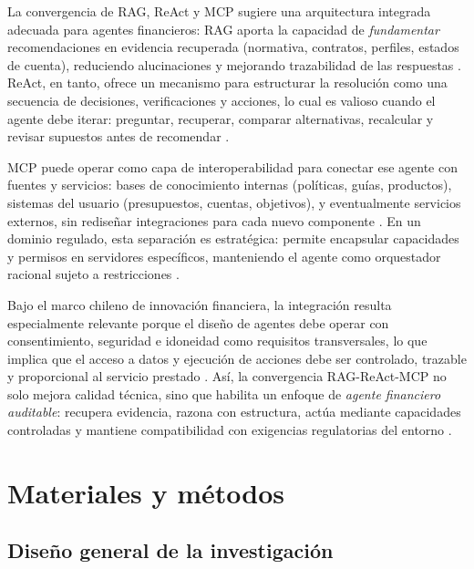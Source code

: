 \documentclass[
	spanish, %
	letterpaper, oneside
]{book}
\begin{document}
La convergencia de RAG, ReAct y MCP sugiere una arquitectura integrada adecuada para agentes financieros: RAG aporta la capacidad de \emph{fundamentar} recomendaciones en evidencia recuperada (normativa, contratos, perfiles, estados de cuenta), reduciendo alucinaciones y mejorando trazabilidad de las respuestas \cite{yu2024rag_survey}. ReAct, en tanto, ofrece un mecanismo para estructurar la resolución como una secuencia de decisiones, verificaciones y acciones, lo cual es valioso cuando el agente debe iterar: preguntar, recuperar, comparar alternativas, recalcular y revisar supuestos antes de recomendar \cite{yao2023react}.

MCP puede operar como capa de interoperabilidad para conectar ese agente con fuentes y servicios: bases de conocimiento internas (políticas, guías, productos), sistemas del usuario (presupuestos, cuentas, objetivos), y eventualmente servicios externos, sin rediseñar integraciones para cada nuevo componente \cite{hou2025mcp}. En un dominio regulado, esta separación es estratégica: permite encapsular capacidades y permisos en servidores específicos, manteniendo el agente como orquestador racional sujeto a restricciones \cite{russell2010aima,hou2025mcp}.

Bajo el marco chileno de innovación financiera, la integración resulta especialmente relevante porque el diseño de agentes debe operar con consentimiento, seguridad e idoneidad como requisitos transversales, lo que implica que el acceso a datos y ejecución de acciones debe ser controlado, trazable y proporcional al servicio prestado \cite{ley21521,cmf_fintech}. Así, la convergencia RAG-ReAct-MCP no solo mejora calidad técnica, sino que habilita un enfoque de \emph{agente financiero auditable}: recupera evidencia, razona con estructura, actúa mediante capacidades controladas y mantiene compatibilidad con exigencias regulatorias del entorno \cite{ley21521,cmf_fintech}.



\chapter{Materiales y métodos}

\section{Diseño general de la investigación}
\end{document}

